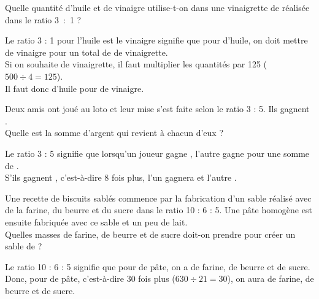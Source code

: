 \begin{colonne*exercice}
\bigskip



\smallskip

\begin{exercice} %
   Quelle quantité d'huile et de vinaigre utilise-t-on dans une vinaigrette de  réalisée dans le ratio 3~:~1 ?
\end{exercice}

\begin{corrige}
   Le ratio 3 : 1 pour l'huile est le vinaigre signifie que pour  d'huile, on doit mettre  de vinaigre pour un total de  de vinaigrette. \\
   Si on souhaite  de vinaigrette, il faut multiplier les quantités par 125 ($500\div4=125$). \\
   Il faut donc {\blue {} d'huile pour  de vinaigre.} \medskip
\end{corrige}

\bigskip


\begin{exercice} %
   Deux amis ont joué au loto et leur mise s'est faite selon le ratio 3 : 5. Ils gagnent . \\
   Quelle est la somme d'argent qui revient à chacun d'eux ?
\end{exercice}

\begin{corrige}
   Le ratio 3 : 5 signifie que lorsqu'un joueur gagne , l'autre gagne  pour une somme de . \\
   S'ils gagnent , c'est-à-dire 8 fois plus, {\blue l'un gagnera  et l'autre .} \medskip
\end{corrige}

\bigskip


\begin{exercice} %
   Une recette de biscuits sablés commence par la fabrication d'un \og sable \fg{} réalisé avec de la farine, du beurre et du sucre dans le ratio 10 : 6 : 5. Une pâte homogène est ensuite fabriquée avec ce sable et un peu de lait. \\
   Quelles masses de farine, de beurre et de sucre doit-on prendre pour créer un \og sable \fg{} de  ?
\end{exercice}

\begin{corrige}
   Le ratio 10 : 6 : 5 signifie que pour  de pâte, on a  de farine,  de beurre et  de sucre. \\
   Donc, pour  de pâte, c'est-à-dire 30 fois plus ($630\div21=30$), on aura {\blue {} de farine,  de beurre et  de sucre.} \medskip
\end{corrige}


\end{colonne*exercice}

